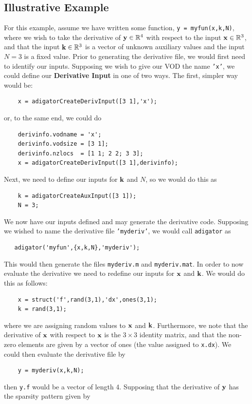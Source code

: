 \documentclass[10pt,pdftex]{article}
\begin{document}
\subsection{Illustrative Example}
For this example, assume we have written some function, \texttt{y = myfun(x,k,N)}, where we wish to take the derivative of $\mathbf{y} \in \mathbb{R}^4$ with respect to the input $\mathbf{x} \in \mathbb{R}^3$, and that the input $\textbf{k} \in \mathbb{R}^3$ is a vector of unknown auxiliary values and the input $N = 3$ is a fixed value. Prior to generating the derivative file, we would first need to identify our inputs. Supposing we wish to give our VOD the name \texttt{'x'}, we could define our {\bf Derivative Input} in one of two ways. The first, simpler way would be:
\begin{verbatim}
    x = adigatorCreateDerivInput([3 1],'x');
\end{verbatim}
or, to the same end, we could do
\begin{verbatim}
    derivinfo.vodname = 'x';
    derivinfo.vodsize = [3 1];
    derivinfo.nzlocs  = [1 1; 2 2; 3 3];
    x = adigatorCreateDerivInput([3 1],derivinfo);
\end{verbatim}
Next, we need to define our inputs for $\textbf{k}$ and $N$, so we would do this as
\begin{verbatim}
    k = adigatorCreateAuxInput([3 1]);
    N = 3;
\end{verbatim}
We now have our inputs defined and may generate the derivative code. Supposing we wished to name the derivative file \texttt{'myderiv'}, we would call \texttt{adigator} as
\begin{verbatim}
   adigator('myfun',{x,k,N},'myderiv');
\end{verbatim}
This would then generate the files \texttt{myderiv.m} and \texttt{myderiv.mat}. In order to now evaluate the derivative we need to redefine our inputs for $\mathbf{x}$ and $\textbf{k}$. We would do this as follows:
\begin{verbatim}
    x = struct('f',rand(3,1),'dx',ones(3,1);
    k = rand(3,1);
\end{verbatim}
where we are assigning random values to $\mathbf{x}$ and $\textbf{k}$. Furthermore, we note  that the derivative of $\mathbf{x}$ with respect to $\mathbf{x}$ is the $3\times 3$ identity matrix, and that the non-zero elements are given by a vector of ones (the value assigned to \texttt{x.dx}). We could then evaluate the derivative file by
\begin{verbatim}
    y = myderiv(x,k,N);
\end{verbatim}
then \texttt{y.f} would be a vector of length 4. Supposing that the derivative of $\mathbf{y}$ has the sparsity pattern given by
\end{document}
